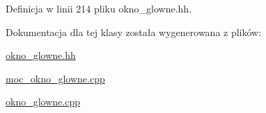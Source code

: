 Definicja w linii 214 pliku okno\-\_\-glowne.\-hh.



Dokumentacja dla tej klasy została wygenerowana z plików\-:\begin{DoxyCompactItemize}
\item 
\hyperlink{okno__glowne_8hh}{okno\-\_\-glowne.\-hh}\item 
\hyperlink{moc__okno__glowne_8cpp}{moc\-\_\-okno\-\_\-glowne.\-cpp}\item 
\hyperlink{okno__glowne_8cpp}{okno\-\_\-glowne.\-cpp}\end{DoxyCompactItemize}

